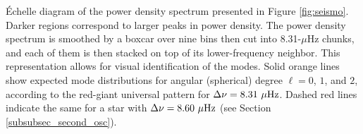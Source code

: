 \label{fig:echelle} \'Echelle diagram of the power density spectrum presented in Figure \ref{fig:seismo}. Darker regions correspond to larger peaks in power density. The power density spectrum is smoothed by a boxcar over nine bins then cut into 8.31-$\mu$Hz chunks, and each of them is then stacked on top of its lower-frequency neighbor. This representation allows for visual identification of the modes. Solid orange lines show expected mode distributions for angular (spherical) degree $\ell = 0$, $1$, and $2$, according to the red-giant universal pattern \citep{mos11} for $\Delta\nu = 8.31\ \mu\rm{Hz}$. Dashed red lines indicate the same for a star with $\Delta\nu = 8.60\ \mu\rm{Hz}$ (see Section \ref{subsubsec_second_osc}).
